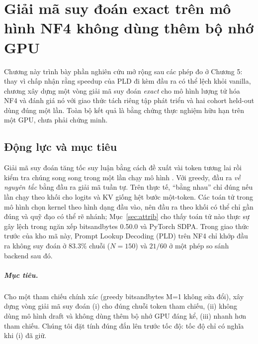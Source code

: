 \chapter{Giải mã suy đoán exact trên mô hình NF4 không dùng thêm bộ nhớ GPU}\label{chap:b2}

\providecommand{\code}[1]{\texttt{\detokenize{#1}}}
\providecommand{\ci}[3]{#1 [#2,\,#3]}

Chương này trình bày phần nghiên cứu mở rộng sau các phép đo ở Chương 5: thay vì chấp nhận rằng speedup của PLD đi kèm đầu ra có thể lệch khỏi vanilla, chương xây dựng một vòng giải mã suy đoán \emph{exact} cho mô hình lượng tử hóa NF4 và đánh giá nó với giao thức tách riêng tập phát triển và hai cohort held-out dùng đúng một lần. Toàn bộ kết quả là bằng chứng thực nghiệm hữu hạn trên một GPU, chưa phải chứng minh.

\section{Động lực và mục tiêu}
Giải mã suy đoán tăng tốc suy luận bằng cách đề xuất vài token tương lai rồi kiểm tra chúng song song trong một lần chạy mô hình \cite{leviathan2023fast,chen2023accelerating}. Với greedy, đầu ra \emph{về nguyên tắc} bằng đầu ra giải mã tuần tự. Trên thực tế, ``bằng nhau'' chỉ đúng nếu lần chạy theo khối cho logits và KV giống hệt bước một-token. Các toán tử trong mô hình chọn kernel theo hình dạng đầu vào, nên đầu ra theo khối có thể chỉ gần đúng và quỹ đạo có thể rẽ nhánh; Mục~\ref{sec:attrib} cho thấy toán tử nào thực sự gây lệch trong ngăn xếp bitsandbytes 0.50.0 và PyTorch SDPA. Trong giao thức trước của kho mã này, Prompt Lookup Decoding (PLD) \cite{saxena2024promptlookup} trên NF4 \cite{dettmers2023qlora} chỉ khớp đầu ra không suy đoán ở $83.3\%$ chuỗi ($N{=}150$) và $21/60$ ở một phép so sánh backend sau đó.

\paragraph{Mục tiêu.} Cho một tham chiếu chính xác (greedy bitsandbytes M=1 không sửa đổi), xây dựng vòng giải mã suy đoán (i) cho đúng chuỗi token tham chiếu, (ii) không dùng mô hình draft và không dùng thêm bộ nhớ GPU đáng kể, (iii) nhanh hơn tham chiếu. Chúng tôi đặt tính đúng đắn lên trước tốc độ: tốc độ chỉ có nghĩa khi (i) đã giữ.

